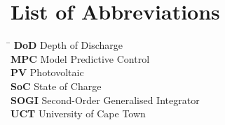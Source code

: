 \chapter*{List of Abbreviations}
\begin{tabbing}
\hspace{2.6cm}\= \kill
\textbf{DoD} \> Depth of Discharge \\
\textbf{MPC} \> Model Predictive Control \\
\textbf{PV} \> Photovoltaic \\
\textbf{SoC} \> State of Charge \\
\textbf{SOGI} \> Second-Order Generalised Integrator \\
\textbf{UCT} \> University of Cape Town \\
\end{tabbing}


